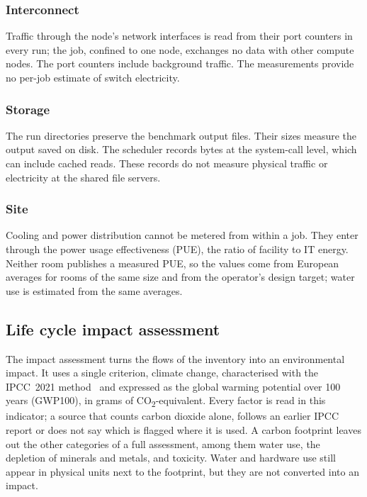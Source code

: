 \documentclass[conference,a4paper]{IEEEtran}
\begin{document}
\subsubsection{Interconnect} Traffic through the node's network interfaces is
read from their port counters in every run; the job, confined to one node,
exchanges no data with other compute nodes. The port counters include background
traffic. The measurements provide no per-job estimate of switch electricity.

\subsubsection{Storage} The run directories preserve the benchmark output files.
Their sizes measure the output saved on disk. The scheduler records bytes at
the system-call level, which can include cached reads. These records do not
measure physical traffic or electricity at the shared file servers.

\subsubsection{Site} Cooling and power distribution cannot be metered from
within a job. They enter through the power usage effectiveness (PUE), the ratio
of facility to IT energy. Neither room publishes a measured PUE, so the values
come from European averages for rooms of the same size and from the operator's
design target; water use is estimated from the same averages.

\subsection{Life cycle impact assessment}\label{sec:lcia}

The impact assessment turns the flows of the inventory into an environmental
impact. It uses a single criterion, climate change, characterised with the
IPCC~2021 method~\cite{ipcc2021} and expressed as the global warming potential
over 100 years (GWP100), in grams of CO\textsubscript{2}-equivalent. Every
factor is read in this indicator; a source that counts carbon dioxide alone,
follows an earlier IPCC report or does not say which is flagged where it is
used. A carbon footprint leaves out the other
categories of a full assessment, among them water use, the depletion of
minerals and metals, and toxicity. Water and hardware use still appear in
physical units next to the footprint, but they are not converted into an impact.
\end{document}
